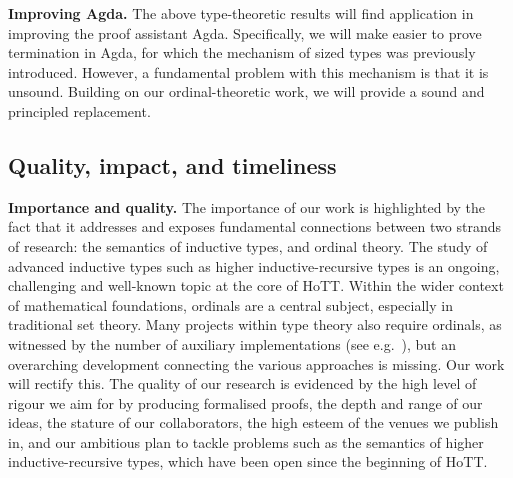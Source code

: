 \documentclass[a4paper,11pt]{article}
\let\oldcite\cite
\renewcommand*\cite[1]{{\protect\NoHyper\oldcite{#1}\protect\endNoHyper}}
\renewcommand{\paragraph}[1]{\textbf{#1.}}
\begin{document}
\paragraph{Improving Agda}
The above type-theoretic results will find application in improving %
the proof assistant Agda. %
Specifically, we will make easier to prove termination in Agda, for which
%
the mechanism of sized types was previously introduced. %
However, a fundamental problem with this mechanism is that it is unsound. Building on our ordinal-theoretic work, we will provide a sound and principled replacement.

\subsection{Quality, impact, and timeliness}

\paragraph{Importance and quality} %
The importance of our work is highlighted by the fact that it addresses and exposes fundamental connections between two strands of research: the semantics of inductive types, and ordinal theory.
%
The study of advanced inductive types such as higher inductive-recursive types is an ongoing, challenging and well-known topic at the core of HoTT.
%
Within the wider context of mathematical foundations, ordinals are a central subject, especially in traditional set theory.
Many projects within type theory also require ordinals, as witnessed by the number of auxiliary implementations (see e.g.\ \cite{Chan2022,Eremondi2023}), but an overarching development connecting the various approaches is missing. Our work will rectify this.
%
The quality of our research is evidenced by the high level of rigour we aim for by producing formalised proofs, the depth and range of our ideas, the stature of our collaborators, the high esteem of the venues we publish in, and our ambitious plan to tackle problems such as the semantics of higher inductive-recursive types, which have been open since the beginning of HoTT. %
\end{document}
